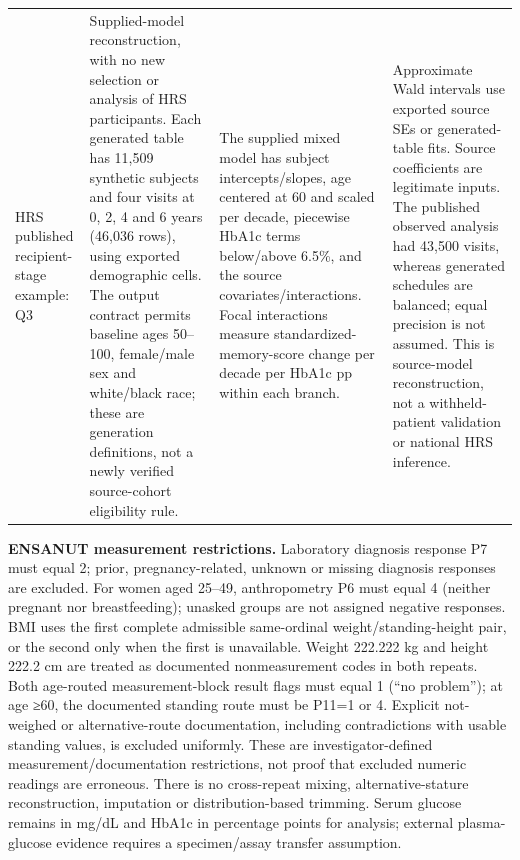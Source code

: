 \documentclass[11pt,letterpaper]{article}
\begin{document}
\begin{xltabular}{\linewidth}{@{}>{\raggedright\arraybackslash}X>{\raggedright\arraybackslash}X>{\raggedright\arraybackslash}X>{\raggedright\arraybackslash}X@{}}
HRS published recipient-stage example: Q3 & Supplied-model reconstruction, with no new selection or analysis of HRS participants. Each generated table has 11,509 synthetic subjects and four visits at 0, 2, 4 and 6 years (46,036 rows), using exported demographic cells. The output contract permits baseline ages 50–\allowbreak{}100, female/\allowbreak{}male sex and white/\allowbreak{}black race; these are generation definitions, not a newly verified source-cohort eligibility rule. & The supplied mixed model has subject intercepts/\allowbreak{}slopes, age centered at 60 and scaled per decade, piecewise HbA1c terms below/\allowbreak{}above 6.5\%, and the source covariates/\allowbreak{}interactions. Focal interactions measure standardized-memory-score change per decade per HbA1c pp within each branch. & Approximate Wald intervals use exported source SEs or generated-table fits. Source coefficients are legitimate inputs. The published observed analysis had 43,500 visits, whereas generated schedules are balanced; equal precision is not assumed. This is source-model reconstruction, not a withheld-patient validation or national HRS inference. \\

\end{xltabular}

\endgroup

\textbf{ENSANUT measurement restrictions.} Laboratory diagnosis response P7 must equal 2; prior, pregnancy-related, unknown or missing diagnosis responses are excluded. For women aged 25–\allowbreak{}49, anthropometry P6 must equal 4 (neither pregnant nor breastfeeding); unasked groups are not assigned negative responses. BMI uses the first complete admissible same-ordinal weight/\allowbreak{}standing-height pair, or the second only when the first is unavailable. Weight 222.222 kg and height 222.2 cm are treated as documented nonmeasurement codes in both repeats. Both age-routed measurement-block result flags must equal 1 (“no problem”); at age ≥60, the documented standing route must be P11=1 or 4. Explicit not-weighed or alternative-route documentation, including contradictions with usable standing values, is excluded uniformly. These are investigator-defined measurement/\allowbreak{}documentation restrictions, not proof that excluded numeric readings are erroneous. There is no cross-repeat mixing, alternative-stature reconstruction, imputation or distribution-based trimming. Serum glucose remains in mg/\allowbreak{}dL and HbA1c in percentage points for analysis; external plasma-glucose evidence requires a specimen/\allowbreak{}assay transfer assumption.
\end{document}
